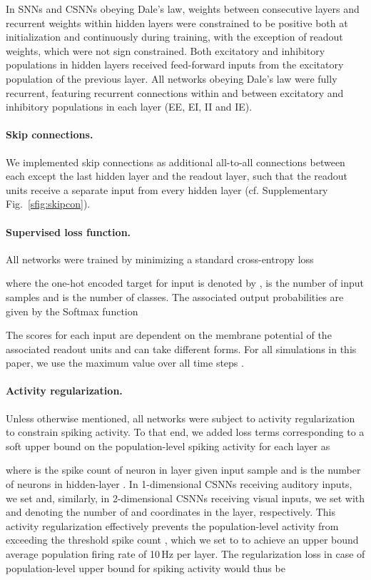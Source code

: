 \documentclass[11pt,a4paper]{article}
\begin{document}
In \acp{SNN} and \acp{CSNN} obeying Dale's law, weights between consecutive layers and recurrent weights within hidden layers were constrained to be positive both at initialization and continuously during training, with the exception of readout weights, which were not sign constrained.
Both excitatory and inhibitory populations in hidden layers received feed-forward inputs from the excitatory population of the previous layer. 
All networks obeying Dale's law were fully recurrent, featuring recurrent connections within and between excitatory and inhibitory populations in each layer (EE, EI, II and IE). 

\paragraph{Skip connections.}
We implemented skip connections as additional all-to-all connections between each except the last hidden layer and the readout layer, such that the readout units receive a separate input from every hidden layer (cf. Supplementary Fig.~\ref{sfig:skipcon}). 

\paragraph{Supervised loss function.} 
All networks were trained by minimizing a standard cross-entropy loss

where the one-hot encoded target for input  is denoted by ,  is the number of input samples and  is the number of classes. 
The associated output probabilities  are given by the Softmax function

The scores  for each input  are dependent on the membrane potential of the associated readout units  and can take different forms. 
For all simulations in this paper, we use the maximum value over all time steps .


\paragraph{Activity regularization.}
Unless otherwise mentioned, all networks were subject to activity regularization to constrain spiking activity. 
To that end, we added loss terms corresponding to a soft upper bound on the population-level spiking activity for each layer  as

where  is the spike count of neuron  in layer  given input sample  and  is the number of neurons in hidden-layer .
In 1-dimensional \acp{CSNN} receiving auditory inputs, we set  and, similarly, in 2-dimensional \acp{CSNN} receiving visual inputs, we set  with   and  denoting the number of  and  coordinates in the layer, respectively.
This activity regularization effectively prevents the population-level activity from exceeding the threshold spike count , which we set to  to achieve an upper bound average population firing rate of 10\,Hz per layer.
The regularization loss in case of population-level upper bound for spiking activity  would thus be
\end{document}
